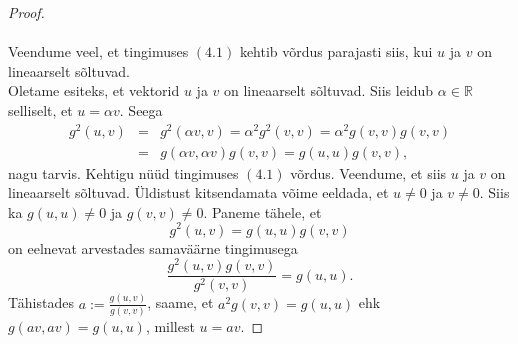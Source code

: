 \documentclass[a4paper,12pt]{article}
\numberwithin{equation}{section}
\begin{document}
\begin{proof}
\paragraph{}
Veendume veel, et tingimuses $(4.1)$ kehtib võrdus parajasti siis, kui $u$ ja $v$ on lineaarselt sõltuvad.\\
Oletame esiteks, et vektorid $u$ ja $v$ on lineaarselt sõltuvad. Siis leidub $\alpha \in \mathbb{R}$ selliselt, et $u = \alpha v$. Seega
\begin{eqnarray*}
g^2\left(u,v\right) &=& g^2 \left(\alpha v,v\right) = \alpha^2 g^2 \left(v,v\right) = \alpha^2 g \left(v,v\right) g \left(v,v\right) \\
&=& g \left(\alpha v,\alpha v\right)g \left( v,v\right) = g \left(u,u\right)g \left(v,v\right),
\end{eqnarray*}
nagu tarvis.
\newline
Kehtigu nüüd tingimuses $(4.1)$ võrdus. Veendume, et siis $u$ ja $v$ on lineaarselt sõltuvad. Üldistust kitsendamata võime eeldada, et $u \neq 0$ ja $v \neq 0$. Siis ka $g \left(u,u\right) \neq 0$ ja $g \left(v,v\right) \neq 0$. Paneme tähele, et
\[g^2 \left(u, v \right) = g \left(u, u \right) g \left(v, v \right)\]
on eelnevat arvestades samaväärne tingimusega
\[\frac{g^2 \left(u, v \right) g \left(v, v \right)}{g^2 \left(v, v \right) } = g \left(u, u \right). \]
Tähistades $a := \frac{g \left(u, v \right) }{g \left(v, v \right) }$, saame, et $a^2 g \left(v, v \right) = g \left(u, u \right)$ ehk $g \left(av, av \right) = g \left(u, u \right)$, millest $u = av$.

\end{proof}
\vfill 
\end{document}
